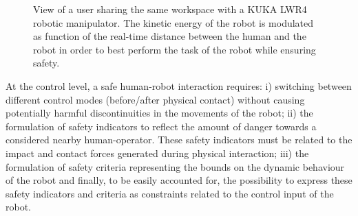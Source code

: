 \begin{figure}[t]
\centering
{}
\caption{View of a user sharing the same workspace with a KUKA LWR4 robotic manipulator. The kinetic energy of the robot is modulated as function of the real-time distance between the human and the robot in order to best perform the task of the robot while ensuring safety.} 
\label{fig:experiment}
\end{figure}
At the control level, a safe human-robot interaction requires: i) switching between different control modes (before/after physical contact) without causing potentially harmful discontinuities in the movements of the robot; ii) the formulation of safety indicators to reflect the amount of danger towards a considered nearby human-operator. These safety indicators must be related to the  impact and contact forces generated during physical interaction; iii) the formulation of safety criteria representing the bounds on the dynamic behaviour of the robot and finally, to be easily accounted for, the possibility to express these safety indicators and criteria as constraints related to the control input of the robot. 

